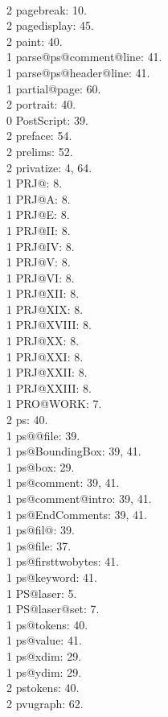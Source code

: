 \\2 pagebreak: 10.
\\2 pagedisplay: 45.
\\2 paint: 40.
\\1 parse@ps@comment@line: 41.
\\1 parse@ps@header@line: 41.
\\1 partial@page: 60.
\\2 portrait: 40.
\\0 PostScript: 39.
\\2 preface: 54.
\\2 prelims: 52.
\\2 privatize: 4, 64.
\\1 PRJ@: 8.
\\1 PRJ@A: 8.
\\1 PRJ@E: 8.
\\1 PRJ@II: 8.
\\1 PRJ@IV: 8.
\\1 PRJ@V: 8.
\\1 PRJ@VI: 8.
\\1 PRJ@XII: 8.
\\1 PRJ@XIX: 8.
\\1 PRJ@XVIII: 8.
\\1 PRJ@XX: 8.
\\1 PRJ@XXI: 8.
\\1 PRJ@XXII: 8.
\\1 PRJ@XXIII: 8.
\\1 PRO@WORK: 7.
\\2 ps: 40.
\\1 ps@@file: 39.
\\1 ps@BoundingBox: 39, 41.
\\1 ps@box: 29.
\\1 ps@comment: 39, 41.
\\1 ps@comment@intro: 39, 41.
\\1 ps@EndComments: 39, 41.
\\1 ps@fil@: 39.
\\1 ps@file: 37.
\\1 ps@firsttwobytes: 41.
\\1 ps@keyword: 41.
\\1 PS@laser: 5.
\\1 PS@laser@set: 7.
\\1 ps@tokens: 40.
\\1 ps@value: 41.
\\1 ps@xdim: 29.
\\1 ps@ydim: 29.
\\2 pstokens: 40.
\\2 pvugraph: 62.
